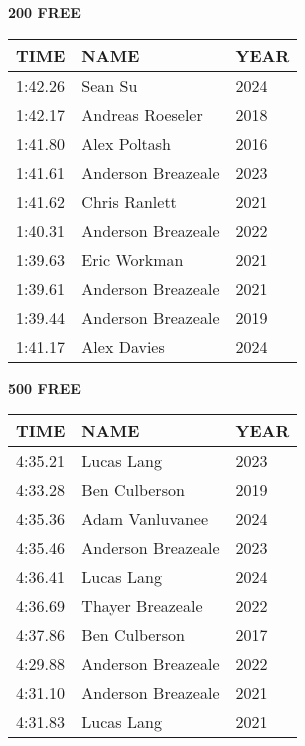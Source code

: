 \begin{table}[H]
\centering
\begin{minipage}[t]{0.48\textwidth}
\centering
\textbf{200 FREE}\\[0.1cm]
\begin{tabular}{@{}p{1.8cm}p{2.8cm}p{1.2cm}@{}}
\hline
    \textbf{TIME} & \textbf{NAME} & \textbf{YEAR} \\
\hline
    1:42.26 & Sean Su & 2024 \\
    1:42.17 & Andreas Roeseler & 2018 \\
    1:41.80 & Alex Poltash & 2016 \\
    1:41.61 & Anderson Breazeale & 2023 \\
    1:41.62 & Chris Ranlett & 2021 \\
    1:40.31 & Anderson Breazeale & 2022 \\
    1:39.63 & Eric Workman & 2021 \\
    1:39.61 & Anderson Breazeale & 2021 \\
    1:39.44 & Anderson Breazeale & 2019 \\
    1:41.17 & Alex Davies & 2024 \\
\hline
\end{tabular}
\end{minipage}\hfill
\begin{minipage}[t]{0.48\textwidth}
\centering
\textbf{500 FREE}\\[0.1cm]
\begin{tabular}{@{}p{1.8cm}p{2.8cm}p{1.2cm}@{}}
\hline
    \textbf{TIME} & \textbf{NAME} & \textbf{YEAR} \\
\hline
    4:35.21 & Lucas Lang & 2023 \\
    4:33.28 & Ben Culberson & 2019 \\
    4:35.36 & Adam Vanluvanee & 2024 \\
    4:35.46 & Anderson Breazeale & 2023 \\
    4:36.41 & Lucas Lang & 2024 \\
    4:36.69 & Thayer Breazeale & 2022 \\
    4:37.86 & Ben Culberson & 2017 \\
    4:29.88 & Anderson Breazeale & 2022 \\
    4:31.10 & Anderson Breazeale & 2021 \\
    4:31.83 & Lucas Lang & 2021 \\
\hline
\end{tabular}
\end{minipage}
\end{table}

